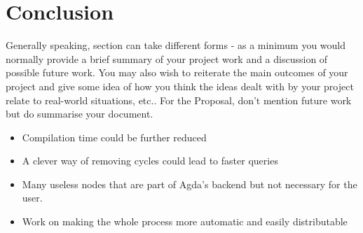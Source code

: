 
\chapter{Conclusion}

Generally speaking, section can take different forms - as a minimum you would
normally provide a brief summary of your project work and a discussion of
possible future work. You may also wish to reiterate the main outcomes of your
project and give some idea of how you think the ideas dealt with by your
project relate to real-world situations, etc.. For the Proposal, don’t mention
future work but do summarise your document.

\begin{itemize}
\item Compilation time could be further reduced 
\item A clever way of removing cycles could lead to faster queries 
\item Many useless nodes that are part of Agda's backend but not necessary for
    the user. 
\item Work on making the whole process more automatic and easily distributable
\end{itemize}

